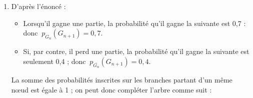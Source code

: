 \begin{corrige}
     \begin{enumerate}
          \item
          D'après l'énoncé :
          \par
          \begin{itemize}
               \item
               \og Lorsqu'il gagne une partie, la probabilité qu'il gagne la suivante est 0,7 \fg{} : donc $\ {p_{G_n}(G_{n+1})=0,7}$.
               \item
               \og Si, par contre, il perd une partie, la probabilité qu'il gagne la suivante est seulement 0,4 \fg{} ; donc $\ {p_{\overline{G_n}}(G_{n+1})=0,4}$.
               \par
          \end{itemize}
          \par
          La somme des probabilités inscrites sur les branches partant d'un même nœud est égale à 1 ; on peut donc compléter l'arbre comme suit :
          \par
          \begin{center}
               \begin{extern}%
\end{extern}
\end{center}
\end{enumerate}
\end{corrige}
